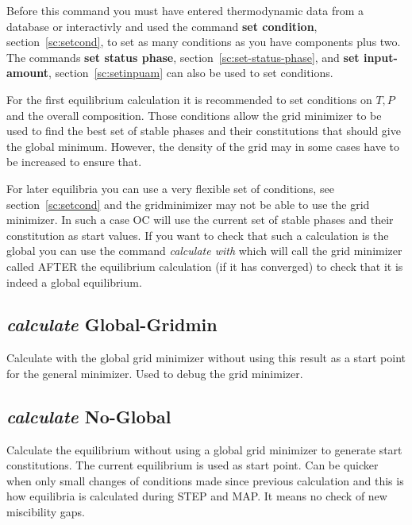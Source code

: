 \documentclass[11pt]{article}
\begin{document}
Before this command you must have entered thermodynamic data from a
database or interactivly and used the command {\bf set condition},
section~\ref{sc:setcond}, to set as many conditions as you have
components plus two.  The commands {\bf set status phase},
section~\ref{sc:set-status-phase}, and {\bf set input-amount},
section~\ref{sc:setinpuam} can also be used to set conditions.

For the first equilibrium calculation it is recommended to set
conditions on $T, P$ and the overall composition.  Those conditions
allow the grid minimizer to be used to find the best set of stable
phases and their constitutions that should give the global minimum.
However, the density of the grid may in some cases have to be
increased to ensure that.

For later equilibria you can use a very flexible set of conditions,
see section~\ref{sc:setcond} and the gridminimizer may not be able to
use the grid minimizer.  In such a case OC will use the current set of
stable phases and their constitution as start values.  If you want to
check that such a calculation is the global you can use the command
{\em calculate with} which will call the grid minimizer called AFTER
the equilibrium calculation (if it has converged) to check that it is
indeed a global equilibrium.

\subsection{{\em calculate} Global-Gridmin}
\hypertarget{Calculate global-gridmin}{}

Calculate with the global grid minimizer without using this result as a
start point for the general minimizer.  Used to debug the grid
minimizer.

\hypertarget{Calculate no-global}{}
\subsection{{\em calculate} No-Global}

Calculate the equilibrium without using a global grid minimizer to
generate start constitutions.  The current equilibrium is used as
start point.  Can be quicker when only small changes of conditions
made since previous calculation and this is how equilibria is
calculated during STEP and MAP.  It means no check of new miscibility
gaps.

\hypertarget{Calculate paraeq2}{}
\end{document}
